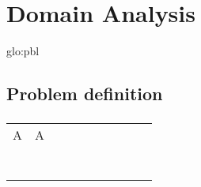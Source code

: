 \chapter{Domain Analysis}

\lipsum[1]
\acrshort{glo:pbl}

\section{Problem definition} \cite{bib:pbl}

\lipsum[2]

\subsection{}

\lipsum[5]




\begin{table}[H]
\begin{tabular}{llllllllll}
                 A & A  &  &  &  &  &  &  &  &  \\
                  &  &  &  &  &  &  &  &  &  \\
                  &  &  &  &  &  &  &  &  &  \\
                  &  &  &  &  &  &  &  &  &  \\
                  &  &  &  &  &  &  &  &  &  \\
                  &  &  &  &  &  &  &  &  &  \\
                  &  &  &  &  &  &  &  &  &  \\
                  &  &  &  &  &  &  &  &  & 
\end{tabular}
\end{table}
\cite{bib:pbl}